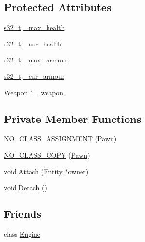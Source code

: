 \subsection*{Protected Attributes}
\begin{DoxyCompactItemize}
\item 
\hyperlink{types_8h_aeeae8d6781b7e821dd3e743202314d66}{s32\-\_\-t} \hyperlink{class_pawn_a5c53c3eb70da162a5336198f963dc350}{\-\_\-max\-\_\-health}
\item 
\hyperlink{types_8h_aeeae8d6781b7e821dd3e743202314d66}{s32\-\_\-t} \hyperlink{class_pawn_afdc8ca44139d27704a2b728cde4a944e}{\-\_\-cur\-\_\-health}
\item 
\hyperlink{types_8h_aeeae8d6781b7e821dd3e743202314d66}{s32\-\_\-t} \hyperlink{class_pawn_a45c9336f40515d51ac568db250e198d9}{\-\_\-max\-\_\-armour}
\item 
\hyperlink{types_8h_aeeae8d6781b7e821dd3e743202314d66}{s32\-\_\-t} \hyperlink{class_pawn_a577fc2cfe23224c96949c4bb3867e8e9}{\-\_\-cur\-\_\-armour}
\item 
\hyperlink{class_weapon}{Weapon} $\ast$ \hyperlink{class_pawn_ac36716d4e38c7031fc48320989ead73d}{\-\_\-weapon}
\end{DoxyCompactItemize}
\subsection*{Private Member Functions}
\begin{DoxyCompactItemize}
\item 
\hyperlink{class_pawn_ae0a9b64c38063a699be94955ad5a212d}{N\-O\-\_\-\-C\-L\-A\-S\-S\-\_\-\-A\-S\-S\-I\-G\-N\-M\-E\-N\-T} (\hyperlink{class_pawn}{Pawn})
\item 
\hyperlink{class_pawn_a74ea3f3372802ad900cc506db056d894}{N\-O\-\_\-\-C\-L\-A\-S\-S\-\_\-\-C\-O\-P\-Y} (\hyperlink{class_pawn}{Pawn})
\item 
void \hyperlink{class_pawn_a9568288d000383638db8c8d56e28e3b0}{Attach} (\hyperlink{class_entity}{Entity} $\ast$owner)
\item 
void \hyperlink{class_pawn_a03d4de56f8932dd8bb2fd8160295ddbf}{Detach} ()
\end{DoxyCompactItemize}
\subsection*{Friends}
\begin{DoxyCompactItemize}
\item 
class \hyperlink{class_pawn_a3e1914489e4bed4f9f23cdeab34a43dc}{Engine}
\end{DoxyCompactItemize}


